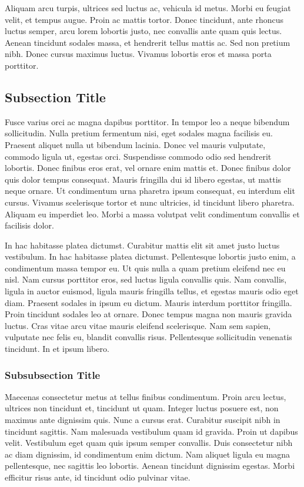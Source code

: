 \documentclass[
	11pt, %
	fleqn, %
	a4paper, %
	oneside, %
]{LegrandOrangeBook}
\begin{document}
Aliquam arcu turpis, ultrices sed luctus ac, vehicula id metus. Morbi eu feugiat velit, et tempus augue. Proin ac mattis tortor. Donec tincidunt, ante rhoncus luctus semper, arcu lorem lobortis justo, nec convallis ante quam quis lectus. Aenean tincidunt sodales massa, et hendrerit tellus mattis ac. Sed non pretium nibh. Donec cursus maximus luctus. Vivamus lobortis eros et massa porta porttitor.

\subsection{Subsection Title}

Fusce varius orci ac magna dapibus porttitor. In tempor leo a neque bibendum sollicitudin. Nulla pretium fermentum nisi, eget sodales magna facilisis eu. Praesent aliquet nulla ut bibendum lacinia. Donec vel mauris vulputate, commodo ligula ut, egestas orci. Suspendisse commodo odio sed hendrerit lobortis. Donec finibus eros erat, vel ornare enim mattis et. Donec finibus dolor quis dolor tempus consequat. Mauris fringilla dui id libero egestas, ut mattis neque ornare. Ut condimentum urna pharetra ipsum consequat, eu interdum elit cursus. Vivamus scelerisque tortor et nunc ultricies, id tincidunt libero pharetra. Aliquam eu imperdiet leo. Morbi a massa volutpat velit condimentum convallis et facilisis dolor.

In hac habitasse platea dictumst. Curabitur mattis elit sit amet justo luctus vestibulum. In hac habitasse platea dictumst. Pellentesque lobortis justo enim, a condimentum massa tempor eu. Ut quis nulla a quam pretium eleifend nec eu nisl. Nam cursus porttitor eros, sed luctus ligula convallis quis. Nam convallis, ligula in auctor euismod, ligula mauris fringilla tellus, et egestas mauris odio eget diam. Praesent sodales in ipsum eu dictum. Mauris interdum porttitor fringilla. Proin tincidunt sodales leo at ornare. Donec tempus magna non mauris gravida luctus. Cras vitae arcu vitae mauris eleifend scelerisque. Nam sem sapien, vulputate nec felis eu, blandit convallis risus. Pellentesque sollicitudin venenatis tincidunt. In et ipsum libero.

\subsubsection{Subsubsection Title}

Maecenas consectetur metus at tellus finibus condimentum. Proin arcu lectus, ultrices non tincidunt et, tincidunt ut quam. Integer luctus posuere est, non maximus ante dignissim quis. Nunc a cursus erat. Curabitur suscipit nibh in tincidunt sagittis. Nam malesuada vestibulum quam id gravida. Proin ut dapibus velit. Vestibulum eget quam quis ipsum semper convallis. Duis consectetur nibh ac diam dignissim, id condimentum enim dictum. Nam aliquet ligula eu magna pellentesque, nec sagittis leo lobortis. Aenean tincidunt dignissim egestas. Morbi efficitur risus ante, id tincidunt odio pulvinar vitae.
\end{document}
